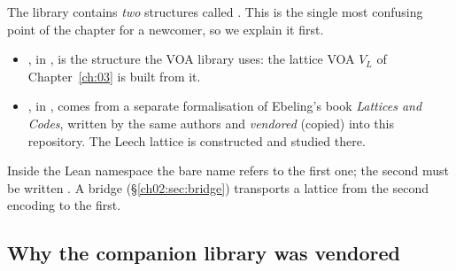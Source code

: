 The library contains \emph{two} structures called .  This is the single
most confusing point of the chapter for a newcomer, so we explain it first.

\begin{itemize}
\item {}, in , is the structure
the VOA library uses: the lattice VOA $V_L$ of Chapter~\ref{ch:03} is built from it.
\item {}, in , comes
from a separate formalisation of Ebeling's book \emph{Lattices and Codes}, written by the same
authors and \emph{vendored} (copied) into this repository.  The Leech lattice is constructed and
studied there.
\end{itemize}
Inside the Lean namespace  the bare name  refers to the first one;
the second must be written .  A bridge
 (\S\ref{ch02:sec:bridge}) transports a lattice from the
second encoding to the first.

\subsection{Why the companion library was vendored}\label{ch02:sec:vendored}

